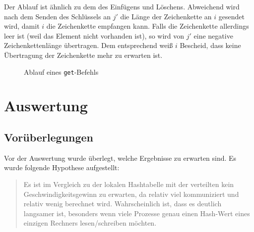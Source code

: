 \documentclass{scrreprt}
\begin{document}
Der Ablauf ist ähnlich zu dem des Einfügens und Löschens. Abweichend wird nach dem Senden des Schlüssels an $j'$ die Länge der Zeichenkette an $i$ gesendet wird, damit $i$ die Zeichenkette empfangen kann. Falls die Zeichenkette allerdings leer ist (weil das Element nicht vorhanden ist), so wird von $j'$ eine negative Zeichenkettenlänge übertragen. Dem entsprechend weiß $i$ Bescheid, dass keine Übertragung der Zeichenkette mehr zu erwarten ist.
\begin{figure}[!ht]
\centering
{}
\caption{Ablauf eines \lstinline`get`-Befehls}
\label{fig:disthashget}
\end{figure}

\chapter{Auswertung}

\section{Vorüberlegungen}
\label{sec:hyp}

Vor der Auswertung wurde überlegt, welche Ergebnisse zu erwarten sind. Es wurde folgende Hypothese aufgestellt:

\begin{quote}
Es ist im Vergleich zu der lokalen Hashtabelle mit der verteilten kein Geschwindigkeitsgewinn zu erwarten, da relativ viel kommuniziert und relativ wenig berechnet wird. Wahrscheinlich ist, dass es deutlich langsamer ist, besonders wenn viele Prozesse genau einen Hash-Wert eines einzigen Rechners lesen/schreiben möchten.
\end{quote}
\end{document}
